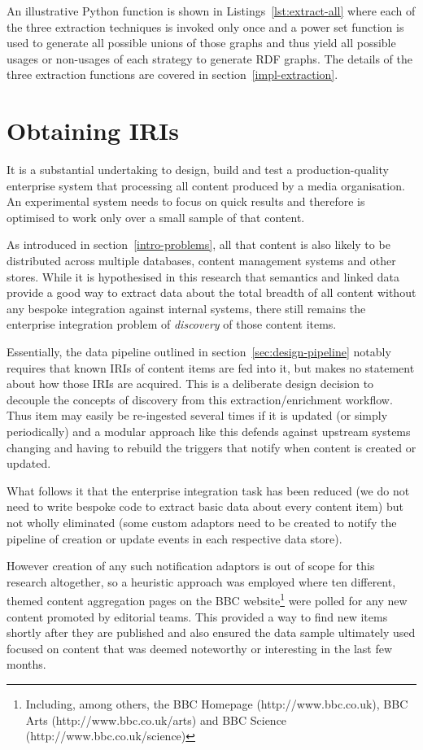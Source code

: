 An illustrative Python function is shown in
Listings~\ref{lst:extract-all} where each of the three extraction
techniques is invoked only once and a power set function is used to
generate all possible unions of those graphs and thus yield all
possible usages or non-usages of each strategy to generate RDF
graphs. The details of the three extraction functions are covered in
section~\ref{impl-extraction}.

\section{Obtaining IRIs}

It is a substantial undertaking to design, build and test a
production-quality enterprise system that processing all content
produced by a media organisation. An experimental system needs to
focus on quick results and therefore is optimised to work only over
a small sample of that content.

As introduced in section~\ref{intro-problems}, all that content is
also likely to be distributed across multiple databases, content
management systems and other stores. While it is hypothesised in
this research that semantics and linked data provide a good way to
extract data about the total breadth of all content without any
bespoke integration against internal systems, there still remains
the enterprise integration problem of \emph{discovery} of those
content items.

Essentially, the data pipeline outlined in
section~\ref{sec:design-pipeline} notably requires that known IRIs of
content items are fed into it, but makes no statement about how those
IRIs are acquired. This is a deliberate design decision to decouple
the concepts of discovery from this extraction/enrichment workflow.
Thus item may easily be re-ingested several times if it is updated
(or simply periodically) and
a modular approach like this defends against upstream systems changing
and having to rebuild the triggers that notify when content is created
or updated.

What follows it that the enterprise integration task has been reduced
(we do not need to write bespoke code to extract basic data about
every content item) but not wholly eliminated (some custom adaptors
need to be created to notify the pipeline of creation or update events
in each respective data store).

However creation of any such notification adaptors is out of scope
for this research altogether, so a heuristic approach was employed
where ten different, themed content aggregation pages on the BBC
website\footnote{
  Including, among others, the BBC Homepage (http://www.bbc.co.uk),
  BBC Arts (http://www.bbc.co.uk/arts) and BBC Science
  (http://www.bbc.co.uk/science)
} were polled for any new content promoted by editorial teams.
This provided a way to find new items shortly after they are published
and also ensured the data sample ultimately used focused on content
that was deemed noteworthy or interesting in the last few months.

